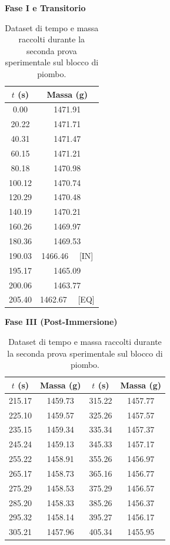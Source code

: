 \documentclass[a4paper,12pt]{article}
\begin{document}
\begin{table}[H]
    \centering
    \footnotesize
    \noindent
    \begin{minipage}[t]{0.42\textwidth}
        \centering
        \textbf{Fase I e Transitorio} \\
        \vspace{0.2cm}
        \begin{tabular}{cc}
            \hline
            $t$ (s) & Massa (g) \\ \hline
            0.00 & 1471.91 \\
            20.22 & 1471.71 \\
            40.31 & 1471.47 \\
            60.15 & 1471.21 \\
            80.18 & 1470.98 \\
            100.12 & 1470.74 \\
            120.29 & 1470.48 \\
            140.19 & 1470.21 \\
            160.26 & 1469.97 \\
            180.36 & 1469.53 \\
            190.03 & 1466.46 \ \ [IN] \\
            195.17 & 1465.09 \\
            200.06 & 1463.77 \\
            205.40 & 1462.67 \ \ [EQ] \\ \hline
        \end{tabular}
    \end{minipage}
    \hfill
    \begin{minipage}[t]{0.54\textwidth}
        \centering
        \textbf{Fase III (Post-Immersione)} \\
        \vspace{0.2cm}
        \begin{tabular}{cc|cc}
            \hline
            $t$ (s) & Massa (g) & $t$ (s) & Massa (g) \\ \hline
            215.17 & 1459.73 & 315.22 & 1457.77 \\
            225.10 & 1459.57 & 325.26 & 1457.57 \\
            235.15 & 1459.34 & 335.34 & 1457.37 \\
            245.24 & 1459.13 & 345.33 & 1457.17 \\
            255.22 & 1458.91 & 355.26 & 1456.97 \\
            265.17 & 1458.73 & 365.16 & 1456.77 \\
            275.29 & 1458.53 & 375.29 & 1456.57 \\
            285.20 & 1458.33 & 385.26 & 1456.37 \\
            295.32 & 1458.14 & 395.27 & 1456.17 \\
            305.21 & 1457.96 & 405.34 & 1455.95 \\ \hline
        \end{tabular}
    \end{minipage}
    \caption{Dataset di tempo e massa raccolti durante la seconda prova sperimentale sul blocco di piombo.}
    \label{tab:dati_piombo_2}
\end{table}
\end{document}
